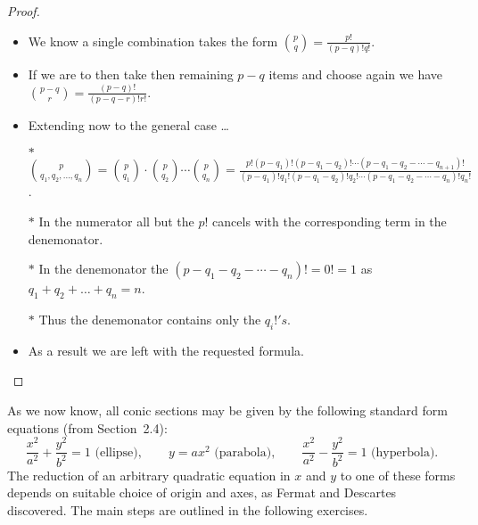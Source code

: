 \documentclass[12pt]{article}
\newcommand{\ds}{\displaystyle}
\theoremstyle{plain}
\begin{document}
\begin{proof}
  \ \\

  \begin{itemize}
    \item We know a single combination takes the form $ \ds \binom{p}{q} = \frac{p!}{(p - q)! q!} $.
    \item If we are to then take then remaining $ p - q $ items and choose again we have $ \ds \binom{p-q}{r} = \frac{(p - q)!}{(p - q - r)! r!} $.
    \item Extending now to the general case \dots
    \item[$\ast$] $ \ds \binom{p}{q_{1}, q_{2}, \dots, q_{n}} = \binom{p}{q_{1}} \cdot \binom{p}{q_{2}} \cdots \binom{p}{q_{n}} = \frac{p!(p - q_{1})! (p - q_{1} - q_{2})! \cdots (p - q_{1} - q_{2} - \cdots - q_{n + 1})!}{(p - q_{1})! q_{1}! (p - q_{1} - q_{2})! q_{2}! \cdots (p - q_{1} - q_{2} - \cdots - q_{n})! q_{n}!} $.
    \item[$\ast$] In the numerator all but the $ p! $ cancels with the corresponding term in the denemonator.
    \item[$\ast$] In the denemonator the $ (p - q_{1} - q_{2} - \cdots - q_{n})! = 0! = 1 $ as $ q_{1} + q_{2} + \dots + q_{n} = n $.
    \item[$\ast$] Thus the denemonator contains only the $ q_{i} !'s $.
    \item As a result we are left with the requested formula. 
  \end{itemize}

\end{proof}

\newpage

As we now know, all conic sections may be given by the following standard form equations (from Section~2.4):
\[
  \frac{x^{2}}{a^{2}} + \frac{y^{2}}{b^{2}} = 1\text{ (ellipse)},\qquad y = ax^{2} \text{ (parabola)}, \qquad \frac{x^{2}}{a^{2}} - \frac{y^{2}}{b^{2}} = 1\text{ (hyperbola)}.
\]
The reduction of an arbitrary quadratic equation in $ x $ and $ y $ to one of these forms depends 
on suitable choice of origin and axes, as Fermat and Descartes discovered. 
The main steps are outlined in the following exercises.

\end{document}

